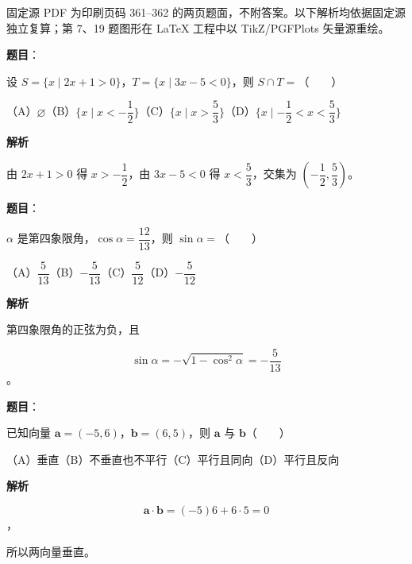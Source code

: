 

\begin{gktip}
固定源 PDF 为印刷页码 361–362 的两页题面，不附答案。以下解析均依据固定源独立复算；第 7、19 题图形在 LaTeX 工程中以 TikZ/PGFPlots 矢量源重绘。
\end{gktip}

\begin{answer}

\textbf{题目}：

设 $S=\{x\mid2x+1>0\}$，$T=\{x\mid3x-5<0\}$，则 $S\cap T=$\mbox{（　　）}

（A）$\varnothing$\quad（B）$\{x\mid x<-\dfrac12\}$\quad（C）$\{x\mid x>\dfrac53\}$\quad（D）$\{x\mid-\dfrac12<x<\dfrac53\}$

\textbf{解析}

由 $2x+1>0$ 得 $x>-\dfrac12$，由 $3x-5<0$ 得 $x<\dfrac53$，交集为 $\left(-\dfrac12,\dfrac53\right)$。


\end{answer}
\begin{answer}

\textbf{题目}：

$\alpha$ 是第四象限角，$\cos\alpha=\dfrac{12}{13}$，则 $\sin\alpha=$\mbox{（　　）}

（A）$\dfrac5{13}$\quad（B）$-\dfrac5{13}$\quad（C）$\dfrac5{12}$\quad（D）$-\dfrac5{12}$

\textbf{解析}

第四象限角的正弦为负，且

\nopagebreak[4]
\[
\sin\alpha=-\sqrt{1-\cos^2\alpha}=-\frac5{13}
\]
。


\end{answer}
\begin{answer}

\textbf{题目}：

已知向量 $\boldsymbol a=(-5,6)$，$\boldsymbol b=(6,5)$，则 $\boldsymbol a$ 与 $\boldsymbol b$\mbox{（　　）}

（A）垂直\quad（B）不垂直也不平行\quad（C）平行且同向\quad（D）平行且反向

\textbf{解析}

\nopagebreak[4]
\[
\boldsymbol a\cdot\boldsymbol b=(-5)6+6\cdot5=0
\]
，

所以两向量垂直。


\end{answer}
